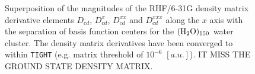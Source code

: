 \documentclass[prl,aps,twocolumn,showpacs,twocolumngrid,superbib]{revtex4}
\begin{document}




\begin{figure}[t]
  \caption{\protect
    Superposition of the magnitudes of the RHF/6-31G density matrix
    derivative elements $D_{cd}$, $D^{x}_{cd}$, $D^{xx}_{cd}$ and $D^{xxx}_{cd}$
    along the $x$ axis with the separation of basis function centers
    for the $\rm (H_2O)_{150}$ water cluster. The density matrix 
    derivatives have been converged to within {\tt TIGHT} (e.g. 
    matrix threshold of $10^{-6}$ $[a.u.]$).
    IT MISS THE GROUND STATE DENSITY MATRIX.
  }\label{fig:Superposition_Decay}
\end{figure}
\end{document}
